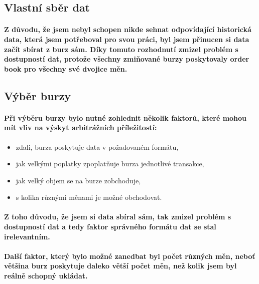 \documentclass[thesis=B,czech]{FITthesis}[2019/03/21]
\begin{document}
\subsection{Vlastní sběr dat}
\paragraph{
Z důvodu, že jsem nebyl schopen nikde sehnat odpovídající historická data, která jsem potřeboval pro svou práci, byl jsem přinucen si data začít sbírat z burz sám. Díky tomuto rozhodnutí zmizel problém s dostupností dat, protože všechny zmiňované burzy poskytovaly order book pro všechny své dvojice měn.
}
\subsection{Výběr burzy}
\paragraph{
Při výběru burzy bylo nutné zohlednit několik faktorů, které mohou mít vliv na výskyt arbitrážních příležitostí: 
}
\begin{itemize}
    \item zdali, burza poskytuje data v požadovaném formátu,
    \item jak velkými poplatky zpoplatňuje burza jednotlivé transakce,
    \item jak velký objem se na burze zobchoduje,
    \item s kolika různými měnami je možné obchodovat.
\end{itemize}
\paragraph{
Z toho důvodu, že jsem si data sbíral sám, tak zmizel problém s dostupností dat a tedy faktor správného formátu dat se stal irelevantním. 
}
\paragraph{
Další faktor, který bylo možné zanedbat byl počet různých měn, neboť většina burz poskytuje daleko větší počet měn, než kolik jsem byl reálně schopný ukládat. 
}
\end{document}
